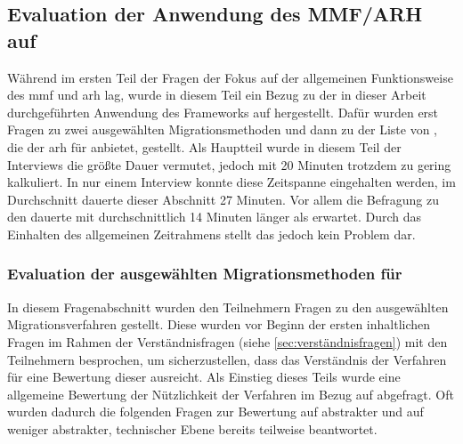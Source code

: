\subsection{Evaluation der Anwendung des MMF/ARH auf \jf}
\label{sec:evaluation-mmf-anwendung}

Während im ersten Teil der Fragen der Fokus auf der allgemeinen Funktionsweise des \gls{mmf} und \gls{arh} lag, wurde in diesem Teil ein Bezug zu der in dieser Arbeit durchgeführten Anwendung des Frameworks auf \jf hergestellt.
Dafür wurden erst Fragen zu zwei ausgewählten Migrationsmethoden und dann zu der Liste von \bpp, die der \gls{arh} für \jf anbietet, gestellt.
Als Hauptteil wurde in diesem Teil der Interviews die größte Dauer vermutet, jedoch mit 20 Minuten trotzdem zu gering kalkuliert.
In nur einem Interview konnte diese Zeitspanne eingehalten werden, im Durchschnitt dauerte dieser Abschnitt 27 Minuten.
Vor allem die Befragung zu den \bpp dauerte mit durchschnittlich 14 Minuten länger als erwartet.
Durch das Einhalten des allgemeinen Zeitrahmens stellt das jedoch kein Problem dar.

\subsubsection{Evaluation der ausgewählten Migrationsmethoden für \jf}
\label{sec:evaluation-mmf-anwendung-methoden}

In diesem Fragenabschnitt wurden den Teilnehmern Fragen zu den ausgewählten Mi\-gra\-ti\-ons\-ver\-fah\-ren gestellt.
Diese wurden vor Beginn der ersten inhaltlichen Fragen im Rahmen der Verständnisfragen (siehe \cref{sec:verständnisfragen}) mit den Teilnehmern besprochen, um sicherzustellen, dass das Verständnis der Verfahren für eine Bewertung dieser ausreicht.
Als Einstieg dieses Teils wurde eine allgemeine Bewertung der Nützlichkeit der Verfahren im Bezug auf \jf abgefragt.
Oft wurden dadurch die folgenden Fragen zur Bewertung auf abstrakter und auf weniger abstrakter, technischer Ebene bereits teilweise beantwortet.

